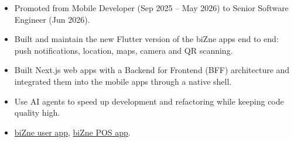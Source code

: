 \documentclass[9pt,a4paper]{altacv}
\begin{document}





\begin{fullwidth}
	\makecvheader
\end{fullwidth}




\begin{itemize}
	\item Promoted from Mobile Developer (Sep 2025 -- May 2026) to Senior Software Engineer (Jun 2026).
	\item Built and maintain the new Flutter version of the biZne apps end to end: push notifications, location, maps, camera and QR scanning.
	\item Built Next.js web apps with a Backend for Frontend (BFF) architecture and integrated them into the mobile apps through a native shell.
	\item Use AI agents to speed up development and refactoring while keeping code quality high.
	\item \href{https://play.google.com/store/apps/details?id=mx.devbizne.bizne&hl=en-US}{biZne user app},
	      \href{https://play.google.com/store/apps/details?id=mx.bizne.kitchen&hl=en-US}{biZne POS app}.
\end{itemize}
\end{document}
